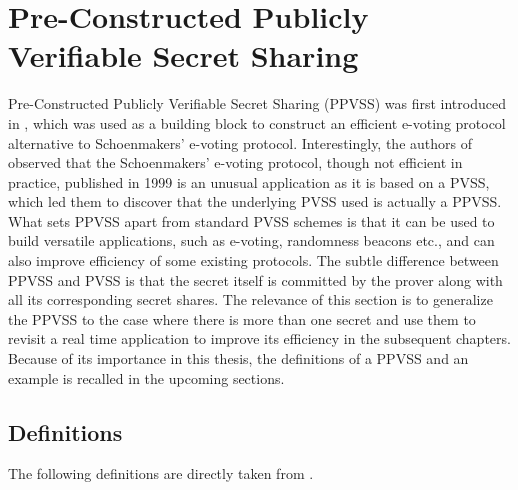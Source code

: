 \section{Pre-Constructed Publicly Verifiable Secret Sharing}
\label{sec:ppvss}
Pre-Constructed Publicly Verifiable Secret Sharing (PPVSS) was first introduced in 
\cite{cryptoeprint:2025/576}, which was used as a building block to 
construct an efficient e-voting protocol alternative to Schoenmakers' e-voting protocol. 
Interestingly, the authors of \cite{cryptoeprint:2025/576} observed that the Schoenmakers' e-voting protocol, though 
not efficient in practice, published in 1999 is an unusual application as it is based on a 
PVSS, which led them to discover that the underlying PVSS used is actually a PPVSS. 
What sets PPVSS apart from standard PVSS schemes is that it can be used to build versatile 
applications, such as e-voting, randomness beacons etc., and can 
also improve efficiency of some existing protocols. The subtle difference between PPVSS and 
PVSS is that the secret itself is committed by the prover along with all its corresponding 
secret shares. The relevance of this section is to generalize the PPVSS to the case 
where there is more than one secret and use them to revisit a real time application 
to improve its efficiency in the subsequent chapters. Because of its importance in this thesis, the 
definitions of a PPVSS and an example is recalled in the upcoming sections.\par

\subsection{Definitions}
\label{sec:ppvss-definitions}

The following definitions are directly taken from \cite{cryptoeprint:2025/576}.

